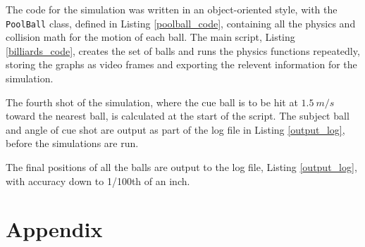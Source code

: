 \documentclass[12pt]{article}
\begin{document}
The code for the simulation was written in an object-oriented style, with the \lstinline{PoolBall} class, defined in Listing \ref{poolball_code}, containing all the physics and collision math for the motion of each ball. The main script, Listing \ref{billiards_code}, creates the set of balls and runs the physics functions repeatedly, storing the graphs as video frames and exporting the relevent information for the simulation.

The fourth shot of the simulation, where the cue ball is to be hit at $1.5 \ m/s$ toward the nearest ball, is calculated at the start of the script. The subject ball and angle of cue shot are output as part of the log file in Listing \ref{output_log}, before the simulations are run.

The final positions of all the balls are output to the log file, Listing \ref{output_log}, with accuracy down to 1/100th of an inch.

\pagebreak
\section{Appendix}

\end{document}
